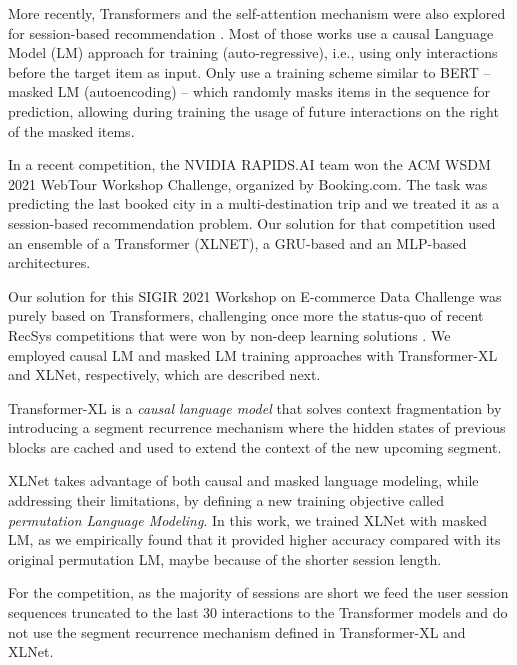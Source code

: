 \documentclass[sigconf,screen]{acmart}
\begin{document}
More recently, Transformers and the self-attention mechanism were also explored for session-based recommendation \cite{chen2019bert4sessrec,zhang2020preference,xu2019graph,pan2020rethinking,sun2019self,luocollaborative,fang2021session}. Most of those works use a causal Language Model (LM) approach for training (auto-regressive), i.e., using only interactions before the target item as input. Only \cite{chen2019bert4sessrec} use a training scheme similar to BERT \cite{devlin2018bert, bianchi2020bert} -- masked LM (autoencoding) -- which randomly masks items in the sequence for prediction, allowing during training the usage of future interactions on the right of the masked items. 

In a recent competition, the NVIDIA RAPIDS.AI team won the ACM WSDM 2021 WebTour Workshop Challenge, organized by Booking.com\cite{goldenberg2021booking}. The task was predicting the last booked city in a multi-destination trip and we treated it as a session-based recommendation problem. Our solution\cite{schifferer2021} for that competition used an ensemble of a Transformer (XLNET), a GRU-based and an MLP-based architectures.

Our solution for this SIGIR 2021 Workshop on E-commerce Data Challenge was purely based on Transformers, challenging once more the status-quo of recent RecSys competitions that were won by non-deep learning solutions \cite{dietmar2020why}. We employed causal LM and masked LM training approaches with Transformer-XL and XLNet, respectively, which are described next.



Transformer-XL \cite{transformerxl2019} is a \emph{causal language model} that solves context fragmentation by introducing a segment recurrence mechanism where the hidden states of previous blocks are cached and used to extend the context of the new upcoming segment. 


XLNet \cite{xlnet2019} takes advantage of both causal and masked language modeling, while addressing their limitations, by defining a new training objective called \emph{permutation Language Modeling}. In this work, we trained XLNet with masked LM, as we empirically found that it provided higher accuracy compared with its original permutation LM, maybe because of the shorter session length. 

For the competition, as the majority of sessions are short we feed the user session sequences truncated to the last 30 interactions to the Transformer models and do not use the segment recurrence mechanism defined in Transformer-XL and XLNet. 
\end{document}
